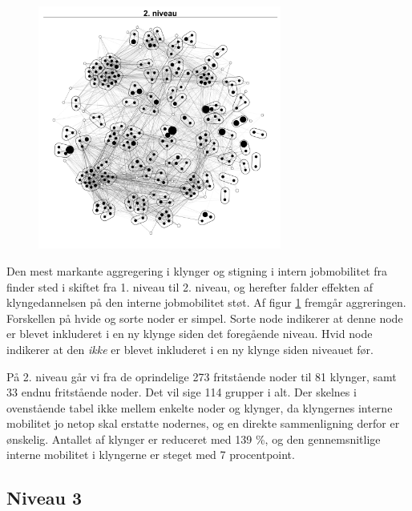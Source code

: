 \begin{figure}
  \vspace{-20pt}
  \begin{center}
   \caption{}
   \label{fig_delanalyse1_kort_seg_proces2}
    \includegraphics[width=8cm]{fig/netvaerkskort/kort_seg_proces2.pdf}
    \label{fig_delanalyse1_kort_seg_proces2}
  \end{center}
  \vspace{-20pt}
\end{figure}

Den mest markante aggregering i klynger og stigning i intern jobmobilitet fra finder sted i skiftet fra 1. niveau til 2. niveau, og herefter falder effekten af klyngedannelsen på den interne jobmobilitet støt. Af figur \ref{fig_delanalyse1_kort_seg_proces2} fremgår aggreringen. Forskellen på hvide og sorte noder er simpel. Sorte node indikerer at denne node er blevet inkluderet i en ny klynge siden det foregående niveau. Hvid node indikerer at den \emph{ikke} er blevet inkluderet i en ny klynge siden niveauet før. 

På 2. niveau går vi fra de oprindelige 273 fritstående noder til 81 klynger, samt 33 endnu fritstående noder. Det vil sige 114 grupper i alt. Der skelnes i ovenstående tabel ikke mellem enkelte noder og klynger, da klyngernes interne mobilitet jo netop skal erstatte nodernes, og en direkte sammenligning derfor er ønskelig. Antallet af klynger er reduceret med 139 \%, og den gennemsnitlige interne mobilitet i klyngerne er steget med 7 procentpoint.


\newpage \subsection{Niveau 3}

